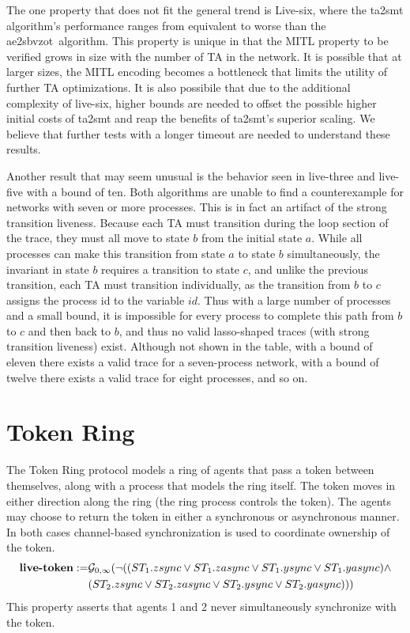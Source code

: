 \documentclass[a4paper,11pt]{report}
\theoremstyle{definition}
\newcommand{\aez}{ae2sbvzot}
\begin{document}
The one property that does not fit the general trend is Live-six, where the
ta2smt algorithm's performance ranges from equivalent to worse than the \aez\
algorithm. This property is unique in that the MITL property to be verified
grows in size with the number of TA in the network. It is possible that at
larger sizes, the MITL encoding becomes a bottleneck that limits the utility of
further TA optimizations. It is also possibile that due to the additional
complexity of live-six, higher bounds are needed to offset the possible higher
initial costs of ta2smt and reap the benefits of ta2smt's superior scaling. We
believe that further tests with a longer timeout are needed to understand these
results.

Another result that may seem unusual is the behavior seen in live-three and
live-five with a bound of ten. Both algorithms are unable to find a
counterexample for networks with seven or more processes. This is in fact an
artifact of the strong transition liveness. Because each TA must transition
during the loop section of the trace, they must all move to state $b$ from the
initial state $a$. While all processes can make this transition from state $a$
to state $b$ simultaneously, the invariant in state $b$ requires a transition to
state $c$, and unlike the previous transition, each TA must transition
individually, as the transition from $b$ to $c$ assigns the process id to the
variable $id$. Thus with a large number of processes and a small bound, it is
impossible for every process to complete this path from $b$ to $c$ and then back
to $b$, and thus no valid lasso-shaped traces (with strong transition liveness)
exist. Although not shown in the table, with a bound of eleven there exists a
valid trace for a seven-process network, with a bound of twelve there exists a
valid trace for eight processes, and so on.

\section{Token Ring}\label{evaluation-token}

The Token Ring protocol models a ring of agents that pass a token between
themselves, along with a process that models the ring itself. The token moves in
either direction along the ring (the ring process controls the token). The
agents may choose to return the token in either a synchronous or asynchronous
manner. In both cases channel-based synchronization is used to coordinate
ownership of the token.
\begin{align*}
  \text{\textbf{live-token}} := & \mathcal{G}_{{0,\infty}} (\neg ((ST_{1}.zsync \lor ST_{1}.zasync \lor ST_{1}.ysync \lor ST_{1}.yasync) \land \\
  & (ST_{2}.zsync \lor ST_{2}.zasync \lor ST_{2}.ysync \lor ST_{2}.yasync))) \\
\end{align*}
This property asserts that agents 1 and 2 never simultaneously synchronize with
the token.
\end{document}
